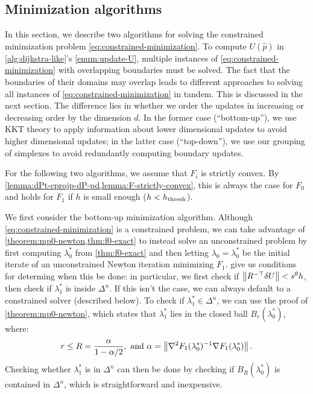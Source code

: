 \documentclass[eikonal.tex]{subfiles}
\begin{document}
\subsection[Optimization algorithms]{Minimization algorithms}

In this section, we describe two algorithms for solving the
constrained minimization problem
\cref{eq:constrained-minimization}. To compute $U(\hat{p})$ in
\cref{alg:dijkstra-like}'s \cref{enum:update-U}, multiple instances of
\cref{eq:constrained-minimization} with overlapping boundaries must be
solved. The fact that the boundaries of their domains may overlap
leads to different approaches to solving all instances of
\cref{eq:constrained-minimization} in tandem. This is discussed in the
next section. The difference lies in whether we order the updates in
increasing or decreasing order by the dimension $d$. In the former
case (``bottom-up''), we use KKT theory to apply information about
lower dimensional updates to avoid higher dimensional updates; in the
latter case (``top-down''), we use our grouping of simplexes to avoid
redundantly computing boundary updates.

For the following two algorithms, we assume that $F_i$ is strictly
convex. By \cref{lemma:dPt-cprojp-dP-pd,lemma:F-strictly-convex}, this
is always the case for $F_0$ and holds for $F_1$ if $h$ is small
enough ($h < h_{\operatorname{thresh}}$).

We first consider the bottom-up minimization algorithm. Although
\cref{eq:constrained-minimization} is a constrained problem, we can
take advantage of \cref{theorem:mp0-newton,thm:f0-exact} to instead
solve an unconstrained problem by first computing $\lambda_0^*$ from
\cref{thm:f0-exact} and then letting $\lambda_0 = \lambda_0^*$ be the
initial iterate of an unconstrained Newton iteration minimizing
$F_1$.  give us conditions for
determing when this be done: in particular, we first check if
$\left\|R^{-\top} \delta U\right\| < s^\theta h$, then check if $\lambda_1^*$
is inside $\Delta^n$. If this isn't the case, we can always default to
a constrained solver (described below). To check if
$\lambda_1^* \in \Delta^n$, we can use the proof of
\cref{theorem:mp0-newton}, which states that $\lambda_1^*$ lies in the
closed ball $B_r(\lambda_0^*)$, where:
\begin{equation}
  r \leq R = \frac{\alpha}{1 - \alpha/2}, \mbox{ and } \alpha = \left\|\nabla^2 F_1(\lambda_0^*)^{-1} \nabla F_1(\lambda_0^*)\right\|.
\end{equation}
Checking whether $\lambda_1^*$ is in $\Delta^n$ can then be done by
checking if $B_R(\lambda_0^*)$ is contained in $\Delta^n$, which is
straightforward and inexpensive.
\end{document}
